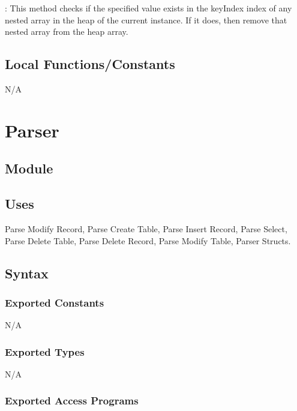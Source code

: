 \documentclass[12pt]{article}
\begin{document}
: This method checks if the specified value exists in the keyIndex index of any nested array in the heap of the current instance. If it does, then remove that nested array from the heap array.\\


\subsection{Local Functions/Constants}
N/A

\newpage

\section {Parser}

\subsection{Module}

\subsection {Uses}
Parse Modify Record, Parse Create Table, Parse Insert Record, Parse Select, Parse Delete Table, Parse Delete Record, {\color{red} Parse Modify Table, Parser Structs}.

\subsection {Syntax}

\subsubsection {Exported Constants}
N/A
\subsubsection {Exported Types}
N/A
\subsubsection {Exported Access Programs}
\end{document}
